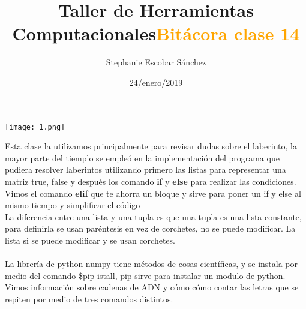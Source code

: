 \documentclass{article}
\title{\Huge Taller de Herramientas Computacionales}
\author{Stephanie Escobar Sánchez}
\date{24/enero/2019}
\begin{document}
	\maketitle
	\begin{center}
		\texttt{[image: 1.png]}	
	\end{center}
	\newpage
	\begin{center}
		\title {\textcolor{orange}{\Huge \textbf{Bitácora clase 14}} }  
	\end{center}

Esta clase la utilizamos principalmente para revisar dudas sobre el laberinto, la mayor parte del tiemplo se empleó en la implementación del programa que pudiera resolver laberintos utilizando primero las listas para representar una matriz true, false y después los comando \textbf{if} y \textbf{else} para realizar las condiciones. Vimos el comando \textbf{elif} que te ahorra un bloque y sirve para poner un if y else al mismo tiempo y simplificar el código \\
La diferencia entre una lista y una tupla es que una tupla es una lista constante, para definirla se usan paréntesis en vez de corchetes, no se puede modificar. La lista si se puede modificar y se usan corchetes.\\
\\
La librería de python numpy tiene métodos de cosas científicas, y se instala por medio del comando \$pip istall,  pip sirve para instalar un modulo de python.
Vimos información sobre cadenas de ADN y cómo cómo contar las letras que se repiten por medio de tres comandos distintos.


	
\end{document}
